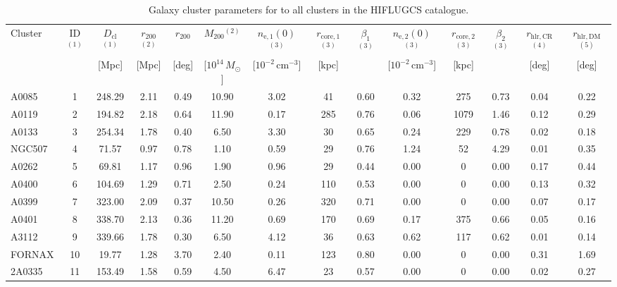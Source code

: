 \documentclass[10pt,aps,pra,reprint,amsmath,amsfonts,amssymb,showpacs,nofootinbib,floatfix]{revtex4-1}
\newcommand{\rmn}{\mathrm}
\newcommand{\clu}{\rmn{cl}}
\newcommand{\msun}{M_\odot}
\newcommand{\vst}{\vspace{-0.14mm}}
\newcommand{\rvir}{r_{200}}
\newcommand{\mvir}{M_{200}}
\begin{document}
\begin{table}
\begin{minipage}{2.0\columnwidth}
  \caption{Galaxy cluster parameters for to all clusters in the HIFLUGCS catalogue.}
\begin{tabular}{l  c c c c c c c c c c c c c}
\hline
\hline
Cluster & ID$^{(1)}$ & $D_\clu$$^{(1)}$ & $\rvir$$^{(2)}$ & $\rvir$ & 
$\mvir$$^{(2)}$ & $n_\rmn{e,1}(0)$$^{(3)}$ & $r_\rmn{core,1}$$^{(3)}$ & 
$\beta_1$$^{(3)}$ & $n_\rmn{e,2}(0)$$^{(3)}$ & $r_\rmn{core,2}$$^{(3)}$ & 
$\beta_2$$^{(3)}$ & $r_\rmn{hlr,CR}$$^{(4)}$ & $r_\rmn{hlr,DM}$  $^{(5)}$ \\
& & [Mpc] & [Mpc] & [deg] & [$10^{14}\,\msun$] 
& [$10^{-2}\,\rmn{cm}^{-3}$] & [kpc] &  & 
  [$10^{-2}\,\rmn{cm}^{-3}$] & [kpc] &  & [deg] & [deg] \\
 \hline
A0085    &   1 & 248.29 &   2.11 &   0.49 &  10.90 &   3.02 &  41 &   0.60 &   0.32 &  275 &   0.73 &   0.04 &   0.22 \vst \\
A0119    &   2 & 194.82 &   2.18 &   0.64 &  11.90 &   0.17 & 285 &   0.76 &   0.06 & 1079 &   1.46 &   0.12 &   0.29 \vst \\
A0133    &   3 & 254.34 &   1.78 &   0.40 &   6.50 &   3.30 &  30 &   0.65 &   0.24 &  229 &   0.78 &   0.02 &   0.18 \vst \\
NGC507   &   4 &  71.57 &   0.97 &   0.78 &   1.10 &   0.59 &  29 &   0.76 &   1.24 &   52 &   4.29 &   0.01 &   0.35 \vst \\
A0262    &   5 &  69.81 &   1.17 &   0.96 &   1.90 &   0.96 &  29 &   0.44 &   0.00 &    0 &   0.00 &   0.17 &   0.44 \vst \\
A0400    &   6 & 104.69 &   1.29 &   0.71 &   2.50 &   0.24 & 110 &   0.53 &   0.00 &    0 &   0.00 &   0.13 &   0.32 \vst \\
A0399    &   7 & 323.00 &   2.09 &   0.37 &  10.50 &   0.26 & 320 &   0.71 &   0.00 &    0 &   0.00 &   0.07 &   0.17 \vst \\
A0401    &   8 & 338.70 &   2.13 &   0.36 &  11.20 &   0.69 & 170 &   0.69 &   0.17 &  375 &   0.66 &   0.05 &   0.16 \vst \\
A3112    &   9 & 339.66 &   1.78 &   0.30 &   6.50 &   4.12 &  36 &   0.63 &   0.62 &  117 &   0.62 &   0.01 &   0.14 \vst \\
FORNAX   &  10 &  19.77 &   1.28 &   3.70 &   2.40 &   0.11 & 123 &   0.80 &   0.00 &    0 &   0.00 &   0.31 &   1.69 \vst \\
2A0335   &  11 & 153.49 &   1.58 &   0.59 &   4.50 &   6.47 &  23 &   0.57 &   0.00 &    0 &   0.00 &   0.02 &   0.27 \vst \\

\end{tabular}
\end{minipage}
\end{table}
\end{document}
